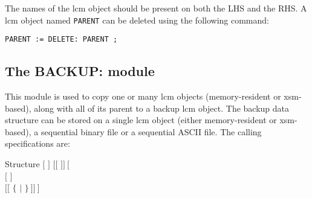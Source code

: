 The names of the {\sc lcm} object should be present on both the LHS and
the RHS. A {\sc lcm} object named {\tt PARENT} can be deleted using the following command:

\begin{verbatim}
PARENT := DELETE: PARENT ;
\end{verbatim}

\clearpage

\subsection{The BACKUP: module}\label{sect:BACKUPData}

This module is used to copy one or many {\sc lcm} objects (memory-resident or {\sc xsm}-based), along with all of its parent to a backup {\sc lcm} object. The backup data
structure can be stored on a single {\sc lcm} object (either memory-resident or {\sc xsm}-based), a sequential binary
file or a sequential ASCII file. The calling specifications are:

\begin{DataStructure}{Structure }
 \moc{:=}  $[$  $]$ $[[$  $]]~[$ \moc{::} \\
 $[$   $]$ \\
 $[[$  $\{$   $|$   $\}~]]~]$ \moc{;}
\end{DataStructure}

